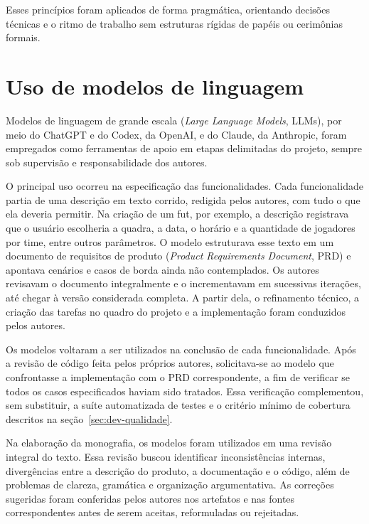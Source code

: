         Esses princípios foram aplicados de forma pragmática, orientando decisões técnicas e o ritmo de trabalho sem estruturas rígidas de papéis ou cerimônias formais.

\section{Uso de modelos de linguagem}
    \label{sec:uso-llm}

        Modelos de linguagem de grande escala (\textit{Large Language Models}, LLMs), por meio do ChatGPT e do Codex, da OpenAI, e do Claude, da Anthropic, foram empregados como ferramentas de apoio em etapas delimitadas do projeto, sempre sob supervisão e responsabilidade dos autores.

        O principal uso ocorreu na especificação das funcionalidades. Cada funcionalidade partia de uma descrição em texto corrido, redigida pelos autores, com tudo o que ela deveria permitir. Na criação de um fut, por exemplo, a descrição registrava que o usuário escolheria a quadra, a data, o horário e a quantidade de jogadores por time, entre outros parâmetros. O modelo estruturava esse texto em um documento de requisitos de produto (\textit{Product Requirements Document}, PRD) e apontava cenários e casos de borda ainda não contemplados. Os autores revisavam o documento integralmente e o incrementavam em sucessivas iterações, até chegar à versão considerada completa. A partir dela, o refinamento técnico, a criação das tarefas no quadro do projeto e a implementação foram conduzidos pelos autores.

        Os modelos voltaram a ser utilizados na conclusão de cada funcionalidade. Após a revisão de código feita pelos próprios autores, solicitava-se ao modelo que confrontasse a implementação com o PRD correspondente, a fim de verificar se todos os casos especificados haviam sido tratados. Essa verificação complementou, sem substituir, a suíte automatizada de testes e o critério mínimo de cobertura descritos na seção~\ref{sec:dev-qualidade}.

        Na elaboração da monografia, os modelos foram utilizados em uma revisão integral do texto. Essa revisão buscou identificar inconsistências internas, divergências entre a descrição do produto, a documentação e o código, além de problemas de clareza, gramática e organização argumentativa. As correções sugeridas foram conferidas pelos autores nos artefatos e nas fontes correspondentes antes de serem aceitas, reformuladas ou rejeitadas.


